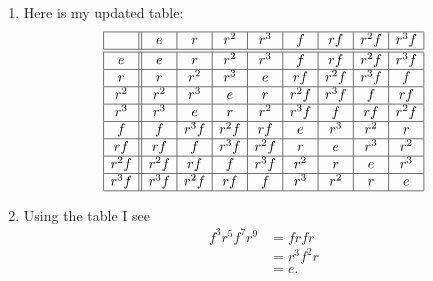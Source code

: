 \documentclass[noauthor,nooutcomes,hints]{ximera}
\begin{document}
\begin{question}
\begin{enumerate}
  \end{enumerate}
  \begin{freeResponse}
    \begin{enumerate}
      \item Here is my updated table:
  \[
  \begin{array}{|c||c|c|c|c|c|c|c|c|}
    \hline
         & e    & r     & r^2     & r^3      & f      & rf     & r^2f      &  r^3 f\\ \hline\hline
    e    & e    & r     & r^2     & r^3      & f      & rf     & r^2f      &  r^3 f\\ \hline
    r    & r    & r^2   & r^3     & e        & rf     & r^2f   & r^3f      & f\\ \hline
    r^2  & r^2  & r^3   & e       & r        & r^2f   & r^3f   &    f      & r  f\\ \hline
    r^3  & r^3  & e     & r       & r^2      & r^3f   &    f   & r  f      & r^2f\\ \hline
    f    & f    & r^3f  & r^2f    & rf       & e      & r^3    & r^2       & r    \\ \hline
    rf   & rf   &  f    & r^3f    & r^2f     & r      & e      & r^3       & r^2   \\ \hline
    r^2f & r^2f & r f   & f       & r^3f     & r^2    & r      & e         & r^3     \\ \hline
    r^3f & r^3f & r^2f  & rf      & f        & r^3    & r^2    & r         & e       \\ \hline
  \end{array}
  \]
\item Using the table I see
  \begin{align*}
    f^3r^5f^7r^9 &= frfr\\
    &= r^3f^2r\\
    &= e.
  \end{align*}
    \end{enumerate}
  \end{freeResponse}
\end{question}
\end{document}

